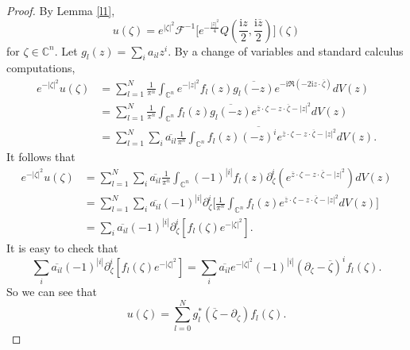 \documentclass[11pt,reqno]{amsart}
\theoremstyle{definition}
\begin{document}
\begin{proof}
By Lemma \ref{l1}, $$u(\zeta)=e^{|\zeta|^2}\mathcal{F}^{-1}\bigg[e^{-\frac{|z|^2}{4}}Q(\frac{\mathrm{i}z}{2},\frac{\mathrm{i}\overline{z}}{2})\bigg](\zeta)$$
for $\zeta\in \mathbb{C}^n$. Let $g_l(z)=\sum_{i} a_{il} z^i.$ By a change of variables and standard calculus computations,
\begin{align*}
e^{-|\zeta|^2}u(\zeta)%
&=\sum_{l=1}^N\frac{1}{\pi^n}\int_{\mathbb{C}^n}  e^{-|z|^2}f_l(z)\overline{g_l(-z)}e^{-\mathrm{i}\Re(-2\mathrm{i}z\cdot\overline{\zeta})}dV(z)\\
&=\sum_{l=1}^N\frac{1}{\pi^n}\int_{\mathbb{C}^n}  f_l(z)\overline{g_l(-z)} e^{\overline{z}\cdot\zeta-z\cdot\overline{\zeta}-|z|^2}dV(z)\\
&=\sum_{l=1}^N\sum_i \overline{a_{il}}\frac{1}{\pi^n}\int_{\mathbb{C}^n} f_l(z)  \overline{(-z)^i} e^{\overline{z}\cdot\zeta-z\cdot\overline{\zeta}-|z|^2}dV(z).
\end{align*}
It follows that
\begin{align*}
e^{-|\zeta|^2}u(\zeta)&=\sum_{l=1}^N\sum_i \overline{a_{il}}\frac{1}{\pi^n}\int_{\mathbb{C}^n} (-1)^{|i|}f_l(z)  \partial_\zeta^i(e^{\overline{z}\cdot\zeta-z\cdot\overline{\zeta}-|z|^2})dV(z)\\
&=\sum_{l=1}^N\sum_i \overline{a_{il}}(-1)^{|i|}\partial_\zeta^i\bigg[\frac{1}{\pi^n}\int_{\mathbb{C}^n} f_l(z)e^{\overline{z}\cdot\zeta-z\cdot\overline{\zeta}-|z|^2}dV(z)\bigg]\\
&=\sum_i \overline{a_{il}} (-1)^{|i|}\partial^i_\zeta[f_l(\zeta)e^{-|\zeta|^2}].
\end{align*}
It is easy to check that
$$\sum_i \overline{a_{il}} (-1)^{|i|}\partial^i_\zeta[f_l(\zeta)e^{-|\zeta|^2}]=\sum_i \overline{a_{il}} e^{-|\zeta|^2}(-1)^{|i|} (\partial_\zeta-\overline{\zeta})^if_l(\zeta).$$
So we can see that
$$u(\zeta)=\sum_{l=0}^Ng_l^*(\overline{\zeta}-\partial_\zeta)f_l(\zeta).$$


\end{proof}
\end{document}
